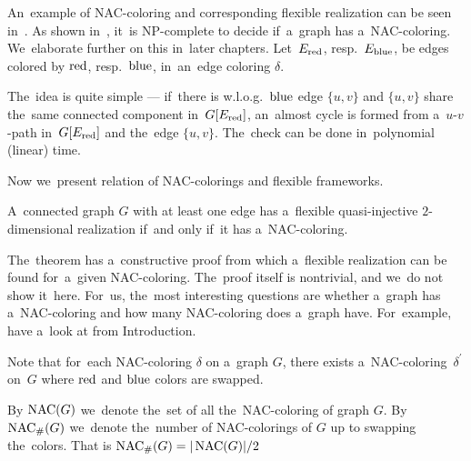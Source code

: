 An~example of NAC-coloring and corresponding flexible realization
can be seen in~.
%
As shown in~\cite{np_complete}, it~is NP-complete to decide if~a~graph has a~NAC-coloring.
We~elaborate further on this in~later chapters.
Let~\( E_{\text{red}}\), resp.\ \( E_{\text{blue}} \), be edges colored by \( \text{red} \), resp.~\( \text{blue} \),
in~an~edge coloring \( \delta \).
%
%
The~idea is quite simple --- if~there is w.l.o.g.\ \( \text{blue} \) edge \( \{u, v\} \)
and \( \{u, v\} \) share the~same connected component in~\( G[E_{\text{red}}] \),
an~almost cycle is formed from a~\( u \)-\( v \)-path in~\( G[E_{\text{red}}] \)
and the~edge \( \{u, v\} \).
The~check can be done in~polynomial (linear) time.

Now we~present relation of NAC-colorings and flexible frameworks.
%
\begin{theorem}
	A~connected graph \( G \) with at least one edge has a~flexible
	quasi-injective \( 2 \)-dimensional realization if~and only if~it has a~NAC-coloring.
\end{theorem}
%
The~theorem has a~constructive proof from which a~flexible realization
can be found for~a~given NAC-coloring.
The~proof itself is nontrivial, and we~do not show it~here.
For~us, the~most interesting questions are whether a~graph has a~NAC-coloring
and how many NAC-coloring does a~graph have.
For~example, have a~look at 
from Introduction.

Note that for~each NAC-coloring \( \delta \) on a~graph \( G \),
there exists a~NAC-coloring~\( \delta^\prime \) on~\( G \)
where \( \text{red} \) and \( \text{blue} \) colors are swapped.
%
\begin{definition}
	By \( \operatorname{NAC}(G) \) we~denote the~set of all the~NAC-coloring of graph \( G \).
	By \( \operatorname{NAC}_{\#} (G) \) we~denote the~number of NAC-colorings of \( G \)
	up to swapping the~colors.
	That is \( \operatorname{NAC}_{\#} (G) = | \operatorname{NAC}(G) | / 2 \)
\end{definition}
%


